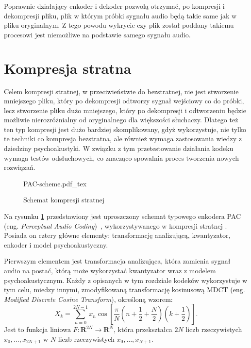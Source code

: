 \documentclass[pl,12pt]{aghdpl}
\let\Oldsection\section%
\renewcommand{\section}{\FloatBarrier\Oldsection}
\begin{document}
Poprawnie działający enkoder i dekoder pozwolą otrzymać, po kompresji i
dekompresji pliku, plik w którym próbki sygnału audio będą takie same jak w
pliku oryginalnym. Z tego powodu wykrycie czy plik został poddany takiemu
procesowi jest niemożliwe na podstawie samego sygnału audio.

\section{Kompresja stratna}

Celem kompresji stratnej, w przeciwieństwie do bezstratnej, nie jest stworzenie
mniejszego pliku, który po dekompresji odtworzy sygnał wejściowy co do próbki, lecz
stworzenie pliku dużo mniejszego, który po dekompresji i odtworzeniu będzie
możliwie nierozróżnialny od oryginalnego dla większości słuchaczy. Dlatego też
ten typ kompresji jest dużo bardziej skomplikowany, gdyż wykorzystuje, nie tylko
te techniki co kompresja bezstratna, ale również wymaga zastosowania wiedzy
z dziedziny psychoakustyki. W związku z tym przetestowanie działania kodeku
wymaga testów odsłuchowych, co znacząco spowalnia proces tworzenia nowych
rozwiązań.

\begin{figure}[!tbh]
  \centering
  {PAC-scheme.pdf_tex}
  \caption{Schemat kompresji stratnej}
  \label{fig:PAC_scheme}
\end{figure}

Na rysunku \ref{fig:PAC_scheme} przedstawiony jest uproszczony schemat typowego
enkodera PAC (eng. \textit{Perceptual Audio Coding})~\cite{BosiGoldberg2002,
Brandenburg1999}, wykorzystywanego w
kompresji stratnej . Posiada on cztery główne elementy: transformację
analizującą, kwantyzator, enkoder i model psychoakustyczny.

Pierwszym elementem jest transformacja analizująca, która zamienia sygnał audio
na postać, którą może wykorzystać kwantyzator wraz z modelem psychoakustycznym.
Każdy z opisanych w tym rozdziale kodeków wykorzystuje w tym celu, miedzy
innymi, zmodyfikowaną transformację kosinusową MDCT (eng. \textit{Modified
Discrete Cosine Transform}), określoną wzorem:
\begin{equation}
  X_k = \sum_{n=0}^{2N-1}x_n\cos\left[\frac{\pi}{N}
  \left(n+\frac{1}{2}+\frac{N}{2}\right)\left(k+\frac{1}{2}\right)\right].
\end{equation}
Jest to funkcja liniowa $F\colon \bm{R}^{2N} \to \bm{R}^N$, która przekształca
$2N$ liczb rzeczywistych $x_0, \dotsc, x_{2N+1}$ w $N$ liczb rzeczywistych
$x_0, \dotsc, x_{N+1}$.
\end{document}
